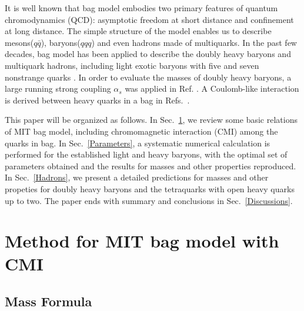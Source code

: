 \documentclass[12pt,onecolumn,floatfix,nofootinbib]{revtex4}
\begin{document}
It is well known that bag model \cite{DeGrand:1975cf} embodies two primary
features of quantum chromodynamics (QCD): asymptotic freedom at short
distance and confinement at long distance. The simple structure of the model
enables us to describe mesons($q\bar{q}$), baryons($qqq$) and even hadrons
made of multiquarks. In the past few decades, bag model has been applied to
describe the doubly heavy baryons\cite%
{Fleck:1989mb,He:2004px,Bernotas:2012nz} and multiquark hadrons, including
light exotic baryons with five and seven nonstrange quarks \cite%
{Strottman:1979qu}. In order to evaluate the masses of doubly heavy baryons,
a large running strong coupling $\alpha _{s}$ was applied in Ref. \cite%
{He:2004px}. A Coulomb-like interaction is derived between heavy quarks in a
bag in Refs.~\cite{Haxton:1980mc,Aerts:1980rf}.

This paper will be organized as follows. In Sec.~\ref{Method}, we review
some basic relations of MIT bag model, including chromomagnetic interaction
(CMI) among the quarks in bag. In Sec.~\ref{Parameters}, a systematic
numerical calculation is performed for the established light and heavy
baryons, with the optimal set of parameters obtained and the results for
masses and other properties reproduced. In Sec.~\ref{Hadrons}, we present a
detailed predictions for masses and other propeties for doubly heavy baryons
and the tetraquarks with open heavy quarks up to two. The paper ends with
summary and conclusions in Sec.~\ref{Discussions}.

\section{Method for MIT bag model with CMI}

\label{Method}

\subsection{Mass Formula}
\end{document}
